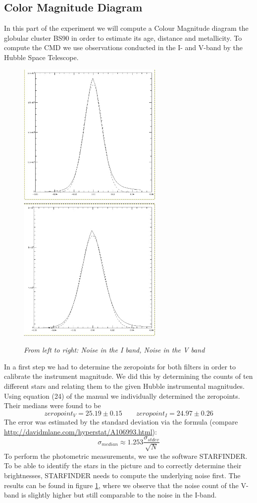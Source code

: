 \subsection{Color Magnitude Diagram}
In this part of the experiment we will compute a Colour Magnitude diagram the globular cluster BS90 in order to estimate its age, distance and metallicity. To compute the CMD we use observations conducted in the I- and V-band by the Hubble Space Telescope.\\
\begin{figure}[h]
	\includegraphics[width=70mm]{Inoise2}
	\includegraphics[width=70mm]{Vnoise}
	\centering
	\caption{ \itshape From left to right: Noise in the I band, Noise in the V band}
	\label{fig:Abbildung 9}
\end{figure}
\noindent
In a first step we had to determine the zeropoints for both filters in order to calibrate the instrument magnitude. We did this by determining the counts of ten different stars and relating them to the given Hubble instrumental magnitudes. Using equation (24) of the manual we individually determined the zeropoints. Their medians were found to be\\ 
\[zeropoint_V = 25.19 \pm 0.15 \qquad zeropoint_I = 24.97 \pm 0.26\]
\noindent
The error was estimated by the standard deviation via the formula (compare \url{http://davidmlane.com/hyperstat/A106993.html}):
\[\sigma_{median} \approx 1.253\frac{ \sigma_{stdev}}{\sqrt{N}}\]
To perform the photometric measurements, we use the software STARFINDER. To be able to identify the stars in the picture and to correctly determine their brightnesses, STARFINDER needs to compute the underlying noise first. The results can be found in figure \ref{fig:Abbildung 9}, where we observe that the noise count of the V-band is slightly higher but still comparable to the noise in the I-band.

